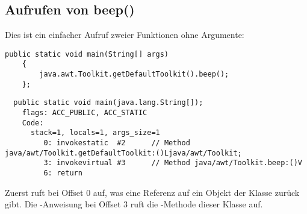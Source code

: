 \subsection{Aufrufen von beep()}

Dies ist ein einfacher Aufruf zweier Funktionen ohne Argumente:

\begin{lstlisting}[style=customjava]
	public static void main(String[] args)
	{
		java.awt.Toolkit.getDefaultToolkit().beep();
	};
\end{lstlisting}

\begin{lstlisting}
  public static void main(java.lang.String[]);
    flags: ACC_PUBLIC, ACC_STATIC
    Code:
      stack=1, locals=1, args_size=1
         0: invokestatic  #2      // Method java/awt/Toolkit.getDefaultToolkit:()Ljava/awt/Toolkit;
         3: invokevirtual #3      // Method java/awt/Toolkit.beep:()V
         6: return        
\end{lstlisting}

Zuerst ruft  bei Offset 0 
auf, was eine Referenz auf ein Objekt der Klasse  zurück gibt.
Die -Anweisung bei Offset 3 ruft die -Methode dieser
Klasse auf.
